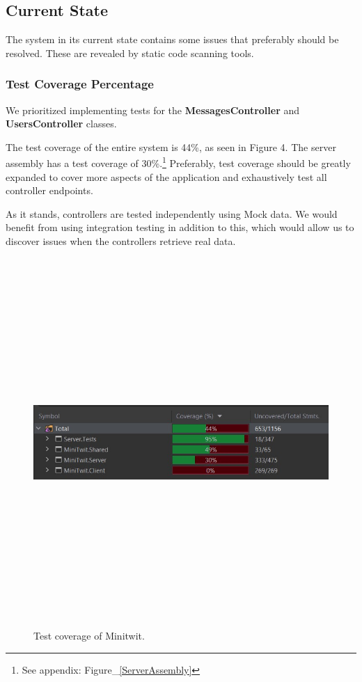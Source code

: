 \subsection{Current State}

The system in its current state contains some issues that preferably should be resolved. These are revealed by static code scanning tools.


\subsubsection{Test Coverage Percentage}
We prioritized implementing tests for the \textbf{MessagesController} and \textbf{UsersController} classes.

The test coverage of the entire system is 44\%, as seen in Figure 4. The server assembly has a test coverage of 30\%.\footnote{See appendix: Figure\_\ref{ServerAssembly}} Preferably, test coverage should be greatly expanded to cover more aspects of the application and exhaustively test all controller endpoints.

As it stands, controllers are tested independently using Mock data. We would benefit from using integration testing in addition to this, which would allow us to discover issues when the controllers retrieve real data.

\begin{figure}[H]
    \centering
    \includegraphics[width=16cm,height=14cm,keepaspectratio]{images/test coverage.jpg}
    \caption{Test coverage of Minitwit.}
    \label{ComponentDiagram_1}
\end{figure}

